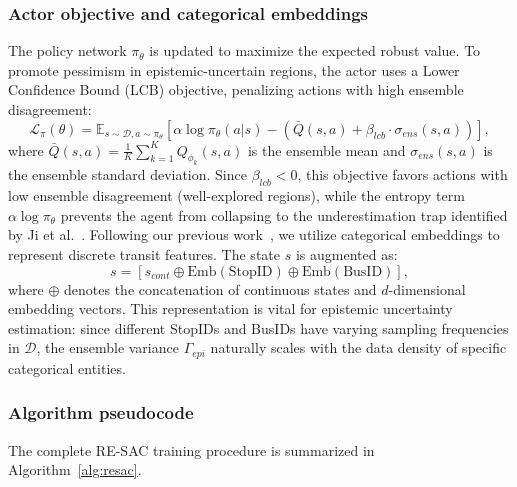 \documentclass[10pt]{article}
\begin{document}
\subsubsection{Actor objective and categorical embeddings}
The policy network $\pi_\theta$ is updated to maximize the expected robust value. To promote pessimism in epistemic-uncertain regions, the actor uses a Lower Confidence Bound (LCB) objective, penalizing actions with high ensemble disagreement:
\begin{equation}
    \mathcal{L}_\pi(\theta) = \mathbb{E}_{s \sim \mathcal{D}, a \sim \pi_\theta} \left[ \alpha \log \pi_\theta(a|s) - \left( \bar{Q}(s, a) + \beta_{lcb} \cdot \sigma_{ens}(s, a) \right) \right],
\end{equation}
where $\bar{Q}(s, a) = \frac{1}{K} \sum_{k=1}^K Q_{\phi_k}(s, a)$ is the ensemble mean and $\sigma_{ens}(s, a)$ is the ensemble standard deviation. Since $\beta_{lcb} < 0$, this objective favors actions with low ensemble disagreement (well-explored regions), while the entropy term $\alpha \log \pi_\theta$ prevents the agent from collapsing to the underestimation trap identified by Ji et al.~\cite{Ji2024SeizingSerendipity}.
Following our previous work~\cite{Zhang2025SingleAgentBus}, we utilize categorical embeddings to represent discrete transit features. The state $s$ is augmented as:
\begin{equation}
    s = [s_{cont} \oplus \text{Emb}(\text{StopID}) \oplus \text{Emb}(\text{BusID})],
\end{equation}
where $\oplus$ denotes the concatenation of continuous states and $d$-dimensional embedding vectors. This representation is vital for epistemic uncertainty estimation: since different StopIDs and BusIDs have varying sampling frequencies in $\mathcal{D}$, the ensemble variance $\Gamma_{epi}$ naturally scales with the data density of specific categorical entities.

\subsubsection{Algorithm pseudocode}
The complete RE-SAC training procedure is summarized in Algorithm~\ref{alg:resac}.
\end{document}
